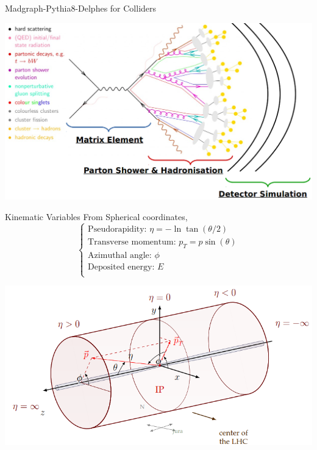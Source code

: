 \documentclass{../../bredelebeamer}
\begin{document}
\begin{frame}{Madgraph-Pythia8-Delphes for Colliders}
	\begin{center}
		\includegraphics[width=.99\linewidth]{../Images/Madgraph.png}
	\end{center}
\end{frame}

\begin{frame}{Kinematic Variables}
    From Spherical coordinates,
    $$
    \begin{cases}
        \text{Pseudorapidity: } \eta = -\ln\tan(\theta/2) \\
        \text{Transverse momentum: } p_T = p \sin(\theta) \\
        \text{Azimuthal angle: } \phi\\
        \text{Deposited energy: } E \\
    \end{cases}
    $$

	\begin{center}
		\includegraphics[width=.98\linewidth]{../Images/Kinematic_Variables.png}
	\end{center}
\end{frame}
\end{document}
